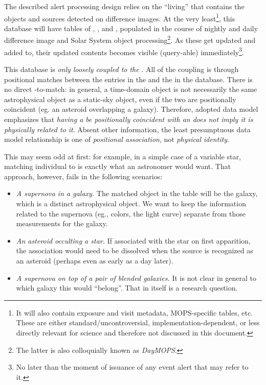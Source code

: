 \documentclass[SE,lsstdraft,toc]{lsstdoc}
\newcommand{\marginreq}[1]{\marginpar{\hspace{0pt}\tiny #1}}
\newcommand{\dmreq}[1]{\marginreq{DMS-REQ-#1}}
\begin{document}
The described alert processing design relies on the ``living'' \DB that contains the objects and sources detected on difference images. At the very least\footnote{It will also contain exposure and visit metadata, MOPS-specific tables, etc. These are either standard/uncontroversial, implementation-dependent, or less directly relevant for science and therefore not discussed in this document.}, this database will have tables of \DIASources,\dmreq{0269} \DIAObjects,\dmreq{0271} and \SSObjects,\dmreq{0273} populated in the course of nightly and daily difference image and Solar System object processing\footnote{The latter is also colloquially known as \emph{DayMOPS}.}. As these get updated and added to, their updated contents becomes visible (query-able) immediately\footnote{No later than the moment of issuance of any event alert that may refer to it.}.\dmreq{0312}

This database is \emph{only loosely coupled to the \DR}. All of the coupling is through positional matches between the \DIAObjects entries in the \DB and the \Objects in the \DR database. There is no direct \DIASource-to-\Object match:
in general, a time-domain object is not necessarily the same astrophysical object as a static-sky object, even if the two are
positionally coincident (eg. an asteroid overlapping a galaxy).
Therefore, adopted data model emphasizes that \emph{having a \DIASource be positionally coincident with an \Object does not imply it is physically related to it}. Absent other information, the least presumptuous data model relationship is one of \emph{positional association}, not \emph{physical identity}.

This may seem odd at first: for example, in a simple case of a variable star, matching individual \DIASources to \Objects is exactly what an astronomer would want. That approach, however, fails in the following scenarios:
\begin{itemize}
\item \emph{A supernova in a galaxy.} The matched object in the \Object table will be the galaxy, which is a distinct astrophysical object. We want to keep the information related to the supernova (eg., colors, the light curve) separate from those measurements for the galaxy.
\item \emph{An asteroid occulting a star.} If associated with the star on first apparition, the association would need to be dissolved when the source is recognized as an asteroid (perhaps even as early as a day later).
\item \emph{A supernova on top of a pair of blended galaxies.} It is not clear in general to which galaxy this \DIASource would ``belong''. That in itself is a research question.
\end{itemize}
\end{document}
